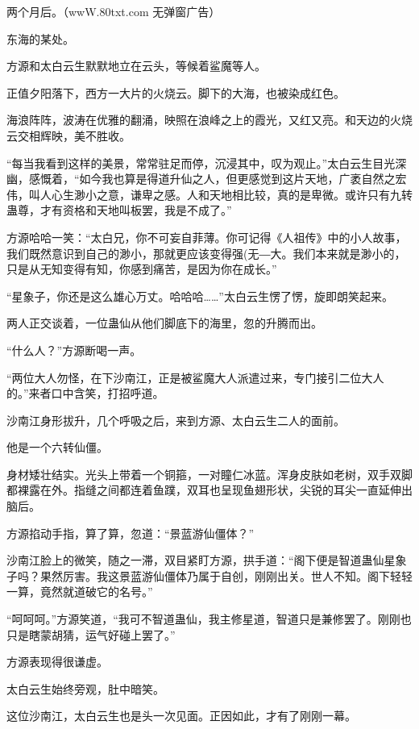 
\begin{this_body}

两个月后。（wwW.80txt.com 无弹窗广告）

东海的某处。

方源和太白云生默默地立在云头，等候着鲨魔等人。

正值夕阳落下，西方一大片的火烧云。脚下的大海，也被染成红色。

海浪阵阵，波涛在优雅的翻涌，映照在浪峰之上的霞光，又红又亮。和天边的火烧云交相辉映，美不胜收。

“每当我看到这样的美景，常常驻足而停，沉浸其中，叹为观止。”太白云生目光深幽，感慨着，“如今我也算是得道升仙之人，但更感觉到这片天地，广袤自然之宏伟，叫人心生渺小之意，谦卑之感。人和天地相比较，真的是卑微。或许只有九转蛊尊，才有资格和天地叫板罢，我是不成了。”

方源哈哈一笑：“太白兄，你不可妄自菲薄。你可记得《人祖传》中的小人故事，我们既然意识到自己的渺小，那就更应该变得强(无―大。我们本来就是渺小的，只是从无知变得有知，你感到痛苦，是因为你在成长。”

“星象子，你还是这么雄心万丈。哈哈哈……”太白云生愣了愣，旋即朗笑起来。

两人正交谈着，一位蛊仙从他们脚底下的海里，忽的升腾而出。

“什么人？”方源断喝一声。

“两位大人勿怪，在下沙南江，正是被鲨魔大人派遣过来，专门接引二位大人的。”来者口中含笑，打招呼道。

沙南江身形拔升，几个呼吸之后，来到方源、太白云生二人的面前。

他是一个六转仙僵。

身材矮壮结实。光头上带着一个铜箍，一对瞳仁冰蓝。浑身皮肤如老树，双手双脚都裸露在外。指缝之间都连着鱼蹼，双耳也呈现鱼翅形状，尖锐的耳尖一直延伸出脑后。

方源掐动手指，算了算，忽道：“景蓝游仙僵体？”

沙南江脸上的微笑，随之一滞，双目紧盯方源，拱手道：“阁下便是智道蛊仙星象子吗？果然厉害。我这景蓝游仙僵体乃属于自创，刚刚出关。世人不知。阁下轻轻一算，竟然就道破它的名号。”

“呵呵呵。”方源笑道，“我可不智道蛊仙，我主修星道，智道只是兼修罢了。刚刚也只是瞎蒙胡猜，运气好碰上罢了。”

方源表现得很谦虚。

太白云生始终旁观，肚中暗笑。

这位沙南江，太白云生也是头一次见面。正因如此，才有了刚刚一幕。


\end{this_body}
